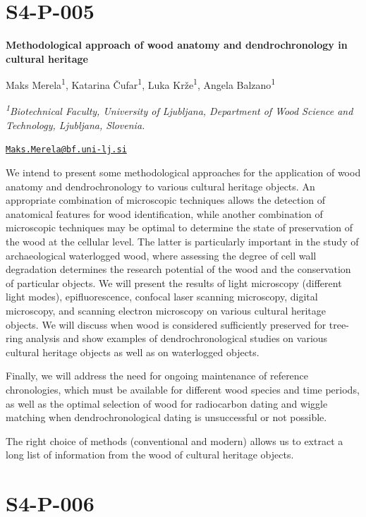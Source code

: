 \documentclass[
]{book}
\begin{document}
\hypertarget{s4-p-005}{%
\section*{S4-P-005}\label{s4-p-005}}

\textbf{Methodological approach of wood anatomy and dendrochronology in cultural heritage}

Maks Merela\textsuperscript{1}, Katarina Čufar\textsuperscript{1}, Luka Krže\textsuperscript{1}, Angela Balzano\textsuperscript{1}

\emph{\textsuperscript{1}Biotechnical Faculty, University of Ljubljana, Department of Wood Science and Technology, Ljubljana, Slovenia.}

\href{mailto:Maks.Merela@bf.uni-lj.si}{\nolinkurl{Maks.Merela@bf.uni-lj.si}}

We intend to present some methodological approaches for the application of wood anatomy and dendrochronology to various cultural heritage objects. An appropriate combination of microscopic techniques allows the detection of anatomical features for wood identification, while another combination of microscopic techniques may be optimal to determine the state of preservation of the wood at the cellular level. The latter is particularly important in the study of archaeological waterlogged wood, where assessing the degree of cell wall degradation determines the research potential of the wood and the conservation of particular objects. We will present the results of light microscopy (different light modes), epifluorescence, confocal laser scanning microscopy, digital microscopy, and scanning electron microscopy on various cultural heritage objects. We will discuss when wood is considered sufficiently preserved for tree-ring analysis and show examples of dendrochronological studies on various cultural heritage objects as well as on waterlogged objects.

Finally, we will address the need for ongoing maintenance of reference chronologies, which must be available for different wood species and time periods, as well as the optimal selection of wood for radiocarbon dating and wiggle matching when dendrochronological dating is unsuccessful or not possible.

The right choice of methods (conventional and modern) allows us to extract a long list of information from the wood of cultural heritage objects.

\hypertarget{s4-p-006}{%
\section*{S4-P-006}\label{s4-p-006}}
\end{document}
